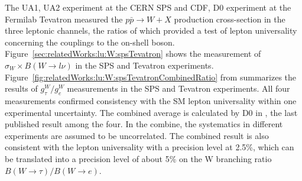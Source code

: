 The UA1, UA2 experiment at the CERN SPS and CDF, D0 experiment at the Fermilab Tevatron measured the $p\bar{p} \to W + X$ production cross-section in the three leptonic channels, the ratios of which provided a test of lepton universality concerning the couplings to the on-shell \PW boson. Figure~\ref{sec:relatedWorks:lu:W:spsTevatron} shows the measurement of $\sigma_W \times B(W\to l \nu)$ in the SPS and Tevatron experiments. Figure~\ref{fig:relatedWorks:lu:W:spsTevatronCombinedRatio} from \cite{Abbott:1999pk} summarizes the results of $g^W_\tau / g^W_e$ measurements in the SPS and Tevatron experiments. All four measurements confirmed consistency with the SM lepton universality within one experimental uncertainty. The combined average is calculated by D0 in \cite{Abbott:1999pk}, the last published result among the four. In the combine, the systematics in different experiments are assumed to be uncorrelated. The combined result is also consistent with the lepton universality with a precision level at 2.5\%, which can be translated into a precision level of about  5\% on the W branching ratio $B(W\to \tau) / B(W\to e)$. 




